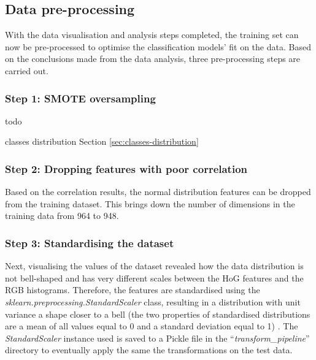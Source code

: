 \documentclass[letterpaper,12pt]{article}
\begin{document}

\newpage
\subsection{Data pre-processing}
\label{sec:data-preprocessing-steps}

With the data visualisation and analysis steps completed, the training set can now be pre-processed to optimise the classification models’ fit on the data. Based on the conclusions made from the data analysis, three pre-processing steps are carried out.

\subsubsection{Step 1: SMOTE oversampling}

todo

classes distribution Section \ref{sec:classes-distribution}

\subsubsection{Step 2: Dropping features with poor correlation}
\label{sec:drop-poor-features}

Based on the correlation results, the normal distribution features can be dropped from the training dataset. This brings down the number of dimensions in the training data from 964 to 948.\\

\subsubsection{Step 3: Standardising the dataset}
\label{sec:standard-scaling}

Next, visualising the values of the dataset revealed how the data distribution is not bell-shaped and has very different scales between the HoG features and the RGB histograms. Therefore, the features are standardised using the \textit{sklearn.preprocessing.StandardScaler} class, resulting in a distribution with unit variance a shape closer to a bell (the two properties of standardised distributions are a mean of all values equal to 0 and a standard deviation equal to 1) \cite{Geron2019}\cite{Glen2014}. The \textit{StandardScaler} instance used is saved to a Pickle file in the ``\textit{transform\_pipeline}'' directory to eventually apply the same the transformations on the test data.
\end{document}
